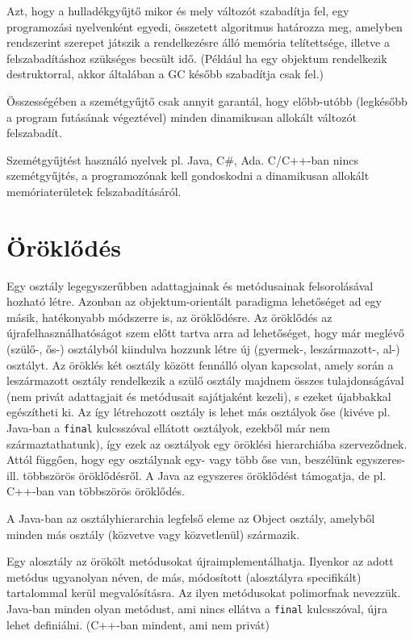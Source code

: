 \documentclass[margin=0px]{article}
\begin{document}
Azt, hogy a hulladékgyűjtő mikor és mely változót szabadítja fel, egy programozási nyelvenként egyedi, összetett algoritmus határozza meg, amelyben rendszerint szerepet játszik a rendelkezésre álló memória telítettsége, illetve a felszabadításhoz szükséges becsült idő. (Például ha egy objektum rendelkezik destruktorral, akkor általában a GC később szabadítja csak fel.)

Összességében a szemétgyűjtő csak annyit garantál, hogy előbb-utóbb (legkésőbb a program futásának végeztével) minden dinamikusan allokált változót felszabadít.

Szemétgyűjtést használó nyelvek pl. Java, C\#, Ada. C/C++-ban nincs szemétgyűjtés, a programozónak kell gondoskodni a dinamikusan allokált memóriaterületek felszabadításáról.

\section{Öröklődés}

Egy osztály legegyszerűbben adattagjainak és metódusainak felsorolásával hozható létre. Azonban az objektum-orientált paradigma lehetőséget ad egy másik, hatékonyabb módszerre is, az öröklődésre. Az öröklődés az újrafelhasználhatóságot szem előtt tartva arra ad lehetőséget, hogy már meglévő (szülő-, ős-) osztályból kiindulva hozzunk létre új (gyermek-, leszármazott-, al-) osztályt. Az öröklés két osztály között fennálló olyan kapcsolat, amely során a leszármazott osztály rendelkezik a szülő osztály majdnem összes tulajdonságával (nem privát adattagjait és metódusait sajátjaként kezeli), s ezeket újabbakkal egészítheti ki. Az így létrehozott osztály is lehet más osztályok őse (kivéve pl. Java-ban a \texttt{final} kulcsszóval ellátott osztályok, ezekből már nem származtathatunk), így ezek az osztályok egy öröklési hierarchiába szerveződnek. Attól függően, hogy egy osztálynak egy- vagy több őse van, beszélünk egyszeres- ill. többszörös öröklődésről. A Java az egyszeres öröklődést támogatja, de pl. C++-ban van többszörös öröklődés.

A Java-ban az osztályhierarchia legfelső eleme az Object osztály, amelyből minden más osztály (közvetve vagy közvetlenül) származik.

Egy alosztály az örökölt metódusokat újraimplementálhatja. Ilyenkor az adott metódus ugyanolyan néven, de más, módosított (alosztályra specifikált) tartalommal kerül megvalósításra. Az ilyen metódusokat polimorfnak nevezzük. Java-ban minden olyan metódust, ami nincs ellátva a \texttt{final} kulcsszóval, újra lehet definiálni. (C++-ban mindent, ami nem privát)\\
\end{document}
